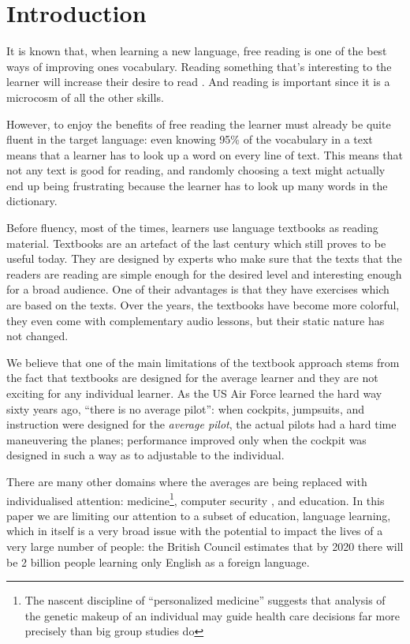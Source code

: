 
\newpage
\section{Introduction}
It is known that, when learning a new language, free reading is one of the best ways of improving ones vocabulary. Reading something that's interesting to the learner will increase their desire to read . And reading is important since it is a microcosm of all the other skills. \cite{mccarthy1999-microcosm} 

However, to enjoy the benefits of free reading the learner must already be quite fluent in the target language: even knowing 95\% of the vocabulary in a text means that a learner has to look up a word on every line of text. \cite{Hirsh92-vocab-size} This means that not any text is good for reading, and randomly choosing a text might actually end up being frustrating because the learner has to look up many words in the dictionary.

Before fluency, most of the times, learners use language textbooks as reading material. Textbooks are an artefact of the last century which still proves to be useful today. They are designed by experts who make sure that the texts that the readers are reading are simple enough for the desired level and interesting enough for a broad audience. One of their advantages is that they have exercises which are based on the texts. Over the years, the textbooks have become more colorful, they even come with complementary audio lessons, but their static nature has not changed.

We believe that one of the main limitations of the textbook approach stems from the fact that textbooks are designed for the average learner and they are not exciting for any individual learner. As the US Air Force learned the hard way sixty years ago, ``there is no average pilot'': when cockpits, jumpsuits, and instruction were designed for the {\em average pilot}, the actual pilots had a hard time maneuvering the planes; performance improved only when the cockpit was designed in such a way as to adjustable to the individual. 

There are many other domains where the averages are being replaced with individualised attention: medicine\footnote{The nascent discipline of ``personalized medicine'' suggests that analysis of the genetic makeup of an individual may guide health care decisions far more precisely than big group studies do}, computer security , and education. In this paper we are limiting our attention to a subset of education, language learning, which in itself is a very broad issue with the potential to impact the lives of a very large number of people: the British Council estimates that by 2020 there will be 2 billion people learning only English as a foreign language. 

